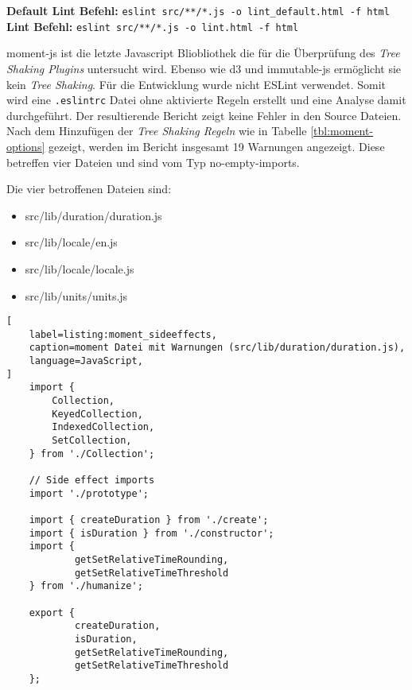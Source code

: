 \begin{center}
\textbf{Default Lint Befehl:} \lstinline{eslint src/**/*.js -o lint_default.html -f html}\linebreak 
\textbf{Lint Befehl:} \lstinline{eslint src/**/*.js -o lint.html -f html}
\end{center}

moment-js ist die letzte Javascript Bliobliothek die für die Überprüfung des \textit{Tree Shaking Plugins} untersucht wird. Ebenso wie d3 und immutable-js ermöglicht sie kein \textit{Tree Shaking}. Für die Entwicklung wurde nicht ESLint verwendet. Somit wird eine \lstinline{.eslintrc} Datei ohne aktivierte Regeln erstellt und eine Analyse damit durchgeführt. Der resultierende Bericht zeigt keine Fehler  in den Source Dateien. Nach dem Hinzufügen der \textit{Tree Shaking Regeln} wie in Tabelle \ref{tbl:moment-options} gezeigt, werden im Bericht insgesamt 19 Warnungen angezeigt. Diese betreffen vier Dateien und sind vom Typ no-empty-imports.

Die vier betroffenen Dateien sind:
\begin{itemize}
\item src/lib/duration/duration.js
\item src/lib/locale/en.js
\item src/lib/locale/locale.js
\item src/lib/units/units.js
\end{itemize}

\begin{lstlisting}[
    label=listing:moment_sideeffects,
	caption=moment Datei mit Warnungen (src/lib/duration/duration.js),
	language=JavaScript,
]
	import {
		Collection,
		KeyedCollection,
		IndexedCollection,
		SetCollection,
	} from './Collection';

	// Side effect imports
	import './prototype';

	import { createDuration } from './create';
	import { isDuration } from './constructor';
	import {
    		getSetRelativeTimeRounding,
    		getSetRelativeTimeThreshold
	} from './humanize';

	export {
    		createDuration,
    		isDuration,
    		getSetRelativeTimeRounding,
    		getSetRelativeTimeThreshold
	};
\end{lstlisting}

